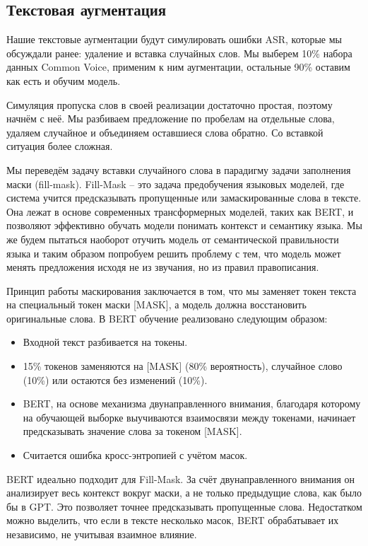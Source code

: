 \subsection{Текстовая аугментация}
Нашие текстовые аугментации будут симулировать ошибки ASR, которые мы обсуждали ранее: удаление и вставка случайных слов.
Мы выберем 10\% набора данных Common Voice, применим к ним аугментации, остальные 90\% оставим как есть и обучим модель.

Симуляция пропуска слов в своей реализации достаточно простая, поэтому начнём с неё.
Мы разбиваем предложение по пробелам на отдельные слова, удаляем случайное и объединяем оставшиеся слова обратно.
Со вставкой ситуация более сложная.

Мы переведём задачу вставки случайного слова в парадигму задачи заполнения маски (fill-mask).
Fill-Mask -- это задача предобучения языковых моделей, где система учится предсказывать пропущенные или замаскированные слова в тексте.
Она лежат в основе современных трансформерных моделей, таких как BERT, и позволяют эффективно обучать модели понимать контекст и семантику языка.
Мы же будем пытаться наоборот отучить модель от семантической правильности языка и таким образом попробуем решить проблему с тем, что модель может менять предложения исходя не из звучания, но из правил правописания.

Принцип работы маскирования заключается в том, что мы заменяет токен текста на специальный токен маски [MASK], а модель должна восстановить оригинальные слова. В BERT обучение реализовано следующим образом:
\begin{itemize}
  \item Входной текст разбивается на токены.
  \item 15\% токенов заменяются на [MASK] (80\% вероятность), случайное слово (10\%) или остаются без изменений (10\%).
  \item BERT, на основе механизма двунаправленного внимания, благодаря которому на обучающей выборке выучиваются взаимосвязи между токенами, начинает предсказывать значение слова за токеном [MASK].
  \item Считается ошибка кросс-энтропией с учётом масок.
\end{itemize}

BERT идеально подходит для Fill-Mask.
За счёт двунаправленного внимания он анализирует весь контекст вокруг маски, а не только предыдущие слова, как было бы в GPT.
Это позволяет точнее предсказывать пропущенные слова.  
Недостатком можно выделить, что если в тексте несколько масок, BERT обрабатывает их независимо, не учитывая взаимное влияние.  

